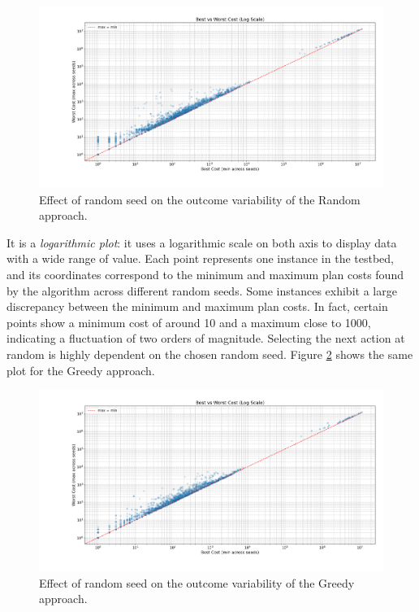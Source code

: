 \begin{figure}[ht]
	\centering
	\includegraphics[width=\textwidth]{images/randomization_random.png}
	\caption{Effect of random seed on the outcome variability of the Random approach.}
	\label{fig:rand_rand}
\end{figure}

It is a \textit{logarithmic plot}: it uses a logarithmic scale on both axis to display data with a wide range of value.
Each point represents one instance in the testbed, and its coordinates correspond to the minimum and maximum plan costs found
by the algorithm across different random seeds.
Some instances exhibit a large discrepancy between the minimum and maximum plan costs. In fact, certain points show a minimum
cost of around 10 and a maximum close to 1000, indicating a fluctuation of two orders of magnitude.
Selecting the next action at random is highly dependent on the chosen random seed.
Figure \ref{fig:rand_greedy} shows the same plot for the Greedy approach.

\begin{figure}[ht]
	\centering
	\includegraphics[width=\textwidth]{images/randomization_greedy.png}
	\caption{Effect of random seed on the outcome variability of the Greedy approach.}
	\label{fig:rand_greedy}
\end{figure}

